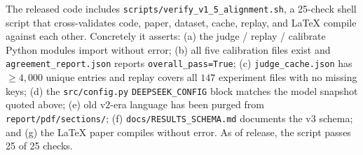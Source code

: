 The released code includes \texttt{scripts/verify\_v1\_5\_alignment.sh}, a 25-check shell script that cross-validates code, paper, dataset, cache, replay, and LaTeX compile against each other. Concretely it asserts: (a) the judge / replay / calibrate Python modules import without error; (b) all five calibration files exist and \texttt{agreement\_report.json} reports \texttt{overall\_pass=True}; (c) \texttt{judge\_cache.json} has $\geq 4{,}000$ unique entries and replay covers all $147$ experiment files with no missing keys; (d) the \texttt{src/config.py} \texttt{DEEPSEEK\_CONFIG} block matches the model snapshot quoted above; (e) old v2-era language has been purged from \texttt{report/pdf/sections/}; (f) \texttt{docs/RESULTS\_SCHEMA.md} documents the v3 schema; and (g) the LaTeX paper compiles without error. As of release, the script passes 25 of 25 checks.
